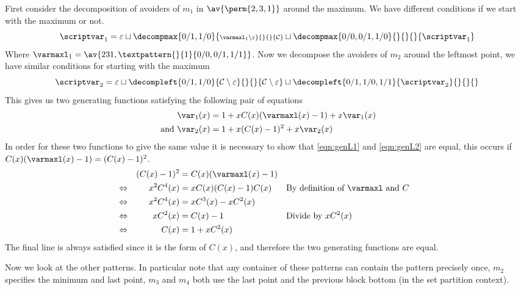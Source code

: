 First consider the decomposition of avoiders of \(m_1\) in \(\av{\perm{2,3,1}}\)
around the maximum. We have different conditions if we start with the maximum or not.
\begin{equation*}
    \scriptvar_1 =
    \varepsilon \sqcup
    \decompmax{0/1,1/0}{\scriptstyle \mathcal{\varmaxl}_1\setminus\varepsilon}{}{}{\mathcal{C}}
    \sqcup
    \decompmax{0/0,0/1,1/0}{}{}{}{\scriptvar_1}
\end{equation*}
Where \(\mathcal{\varmaxl}_1 = \av{231,\textpattern{}{1}{0/0,0/1,1/1}}\).
Now we decompose the avoiders of \(m_2\) around the leftmost point, we have similar
conditions for starting with the maximum
\begin{equation*}
    \scriptvar_2 =
    \varepsilon \sqcup
    \decompleft{0/1,1/0}{\mathcal{C}\setminus\varepsilon}{}{}{\mathcal{C}\setminus\varepsilon}
    \sqcup
    \decompleft{0/1,1/0,1/1}{\scriptvar_2}{}{}{}
\end{equation*}
This gives us two generating functions satisfying the following pair of equations
\begin{align}
    \var_1(x) &= 1 + xC(x)(\varmaxl(x)-1) +x\var_1(x) \label{eqn:genL1}\\
    \text{ and }\var_2(x) &= 1 + x(C(x)-1)^2 + x\var_2(x) \label{eqn:genL2}
\end{align}
In order for these two functions to give the same value it is necessary to show that
\eqref{eqn:genL1} and \eqref{eqn:genL2} are equal, this occurs if
\(C(x)(\varmaxl(x)-1) = (C(x)-1)^2\).
\begin{align*}
    &&(C(x)-1)^2 &= C(x)(\varmaxl(x)-1)\\
        &\Leftrightarrow& x^2C^4(x) &=  xC(x)(C(x)-1)C(x) &&\text{By definition of \(\varmaxl\) and \(C\)}\\
        &\Leftrightarrow& x^2C^4(x)&=xC^3(x)-xC^2(x)\\
        &\Leftrightarrow& xC^2(x) &= C(x) -1 &&\text{Divide by \(xC^2(x)\)}\\
        &\Leftrightarrow& C(x) &= 1 +xC^2(x)
\end{align*}
The final line is always satisfied since it is the form of \(C(x)\), and
therefore the two generating functions are equal.

Now we look at the other patterns. In particular note that any container of these
patterns can contain the pattern precisely once, \(m_2\) specifies the
minimum and last point, \(m_3\) and \(m_4\) both use the last point and the
previous block bottom (in the set partition context).

